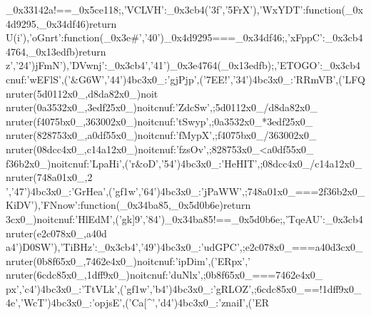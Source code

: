 {_0x33142a!==_0x5ce118;},'VCLVH':_0x3cb4('‫3f','5FrX'),'WxYDT':function(_0x4d9295,_0x34df46){return _0x4d9295===_0x34df46;},'xFppC':_0x3cb4('‫40','#U(i'),'oGnrt':function(_0x3e4764,_0x13edfb){return _0x3e4764(_0x13edfb);},'ETOGO':_0x3cb4('‫41','jFmN'),'DVwnj':_0x3cb4('‮42','zQFL'),'BVmRR':_0x3cb4('‮43','!EE7'),'pjPjg':_0x3cb4('‮44','W6G&'),'SlFEw':function(_0x28ad8d,_0x2110d5){return _0x28ad8d/_0x2110d5;},'wScdZ':function(_0x52fde3,_0x2353a0){return _0x52fde3*_0x2353a0;},'pywSt':function(_0x200363,_0xb5704f){return _0x200363/_0xb5704f;},'XpyMf':function(_0x55fd0a,_0x357828){return _0x55fd0a>_0x357828;},'vOszf':function(_0x21a41c,_0x4ccd80){return _0x21a41c/_0x4ccd80;},'TIHeH':_0x3cb4('‮45','Do&r'),'iHapL':function(_0x2b63f2,_0x10a847){return _0x2b63f2===_0x10a847;},'WWaPj':_0x3cb4('‮46','w1fg'),'aeHrG':_0x3cb4('‫47','KiDV'),'FNnow':function(_0x34ba85,_0x5d0b6e){return _0x34ba85!==_0x5d0b6e;},'TqeAU':_0x3cb4('‮48','9[kg'),'MdElH':function(_0xc3d04a,_0x870c2e){return _0xc3d04a===_0x870c2e;},'CPGdu':_0x3cb4('‫49','D0SW'),'TiBHz':_0x3cb4('‮4a','xpRE'),'miDpi':function(_0x4e2647,_0x56f8b0){return _0x4e2647===_0x56f8b0;},'xlNud':function(_0x9ffd1,_0x58cdc6){return _0x9ffd1!==_0x58cdc6;},'ZOLRg':_0x3cb4('‮4b','w1fg'),'kLVtT':_0x3cb4('‮4c','xpRE'),'Iianz':_0x3cb4('‮4d','^]aC'),'Esjpo':_0x3cb4('‫4e','WcT%
